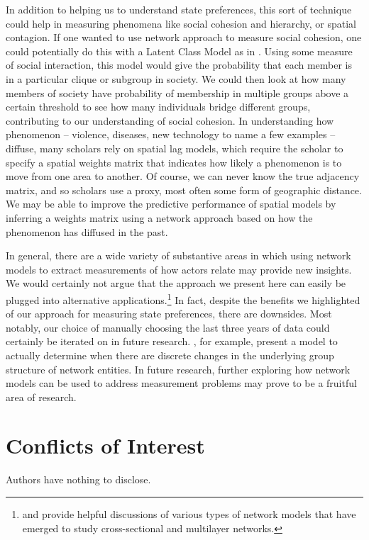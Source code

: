 \documentclass[12pt,pdflatex]{elsarticle}
\begin{document}
In addition to helping us to understand state preferences, this sort of technique could help in measuring phenomena like social cohesion and hierarchy, or spatial contagion. If one wanted to use network approach to measure social cohesion, one could potentially do this with a Latent Class Model as in \citet{airoldi:etal:2008}. Using some measure of social interaction, this model would give the probability that each member is in a particular clique or subgroup in society. We could then look at how many members of society have probability of membership in multiple groups above a certain threshold to see how many individuals bridge different groups, contributing to our understanding of social cohesion. In understanding how phenomenon -- violence, diseases, new technology to name a few examples -- diffuse, many scholars rely on spatial lag models, which require the scholar to specify a spatial weights matrix that indicates how likely a phenomenon is to move from one area to another. Of course, we can never know the true adjacency matrix, and so scholars use a proxy, most often some form of geographic distance. We may be able to improve the predictive performance of spatial models by inferring a weights matrix using a network approach based on how the phenomenon has diffused in the past.

In general, there are a wide variety of substantive areas in which using network models to extract measurements of how actors relate may provide new insights. We would certainly not argue that the approach we present here can easily be plugged into alternative applications.\footnote{\citet{goldenberg:etal:2010} and \citet{kim:etal:2018} provide helpful discussions of various types of network models that have emerged to study cross-sectional and multilayer networks.} In fact, despite the benefits we highlighted of our approach for measuring state preferences, there are downsides. Most notably, our choice of manually choosing the last three years of data could certainly be iterated on in future research. \citet{park:sohn:2017}, for example, present a model to actually determine when there are discrete changes in the underlying group structure of network entities. In future research, further exploring how network models can be used to address measurement problems may prove to be a fruitful area of research.

\newpage

\section*{Conflicts of Interest}

Authors have nothing to disclose.

\clearpage

\end{document}
